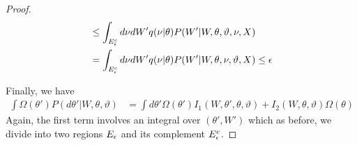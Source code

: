 \begin{proof}
\begin{align*}
  &\le \int_{E^c_{\epsilon}} d\nu dW'
  q(\nu | \theta) P(W' | W, \theta, \vartheta, \nu, X) \\
 &= \int_{E^c_{\epsilon}} d\nu dW'
 q(\nu | \theta) P(W' |  W, \theta, \nu, \vartheta, X)
\le \epsilon
\end{align*}

Finally, we have
\begin{align*}
  \int \Omega(\theta') P(d\theta'| W, \theta, \vartheta)
  &= \int d\theta' \Omega(\theta') I_1(W, \theta', \theta, \vartheta) + I_2(W, \theta, \vartheta) \Omega(\theta)
\end{align*}
Again, the first term involves an integral over $(\theta',W')$ which as
before, we divide into two regions $E_\epsilon$ and its complement
$E^c_\epsilon$.


\end{proof}
